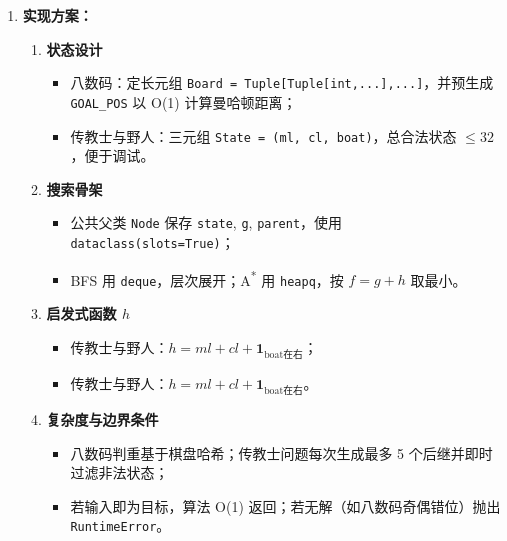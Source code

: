 \documentclass[UTF8]{ctexart}
\begin{document}
\begin{enumerate}
  \item \textbf{实现方案：}
  \begin{enumerate}[label=(\alph*)]
    \item \textbf{状态设计}
      \begin{itemize}
        \item 八数码：定长元组 \verb|Board = Tuple[Tuple[int,...],...]|，并预生成 \verb|GOAL_POS| 以 O(1) 计算曼哈顿距离；
        \item 传教士与野人：三元组 \verb|State = (ml, cl, boat)|，总合法状态 $\le 32$，便于调试。
      \end{itemize}
    \item \textbf{搜索骨架}
      \begin{itemize}
        \item 公共父类 \verb|Node| 保存 \verb|state|, \verb|g|, \verb|parent|，使用 \verb|dataclass(slots=True)|；
        \item BFS 用 \verb|deque|，层次展开；A\textsuperscript{*} 用 \verb|heapq|，按 \(f=g+h\) 取最小。
      \end{itemize}
    \item \textbf{启发式函数 \(h\)}
      \begin{itemize}
        \item 传教士与野人：\(h = ml + cl + \mathbf{1}_{\text{boat在右}}\)；
        \item 传教士与野人：\(h = ml + cl + \mathbf{1}_{\text{boat在右}}\)。
      \end{itemize}
    \item \textbf{复杂度与边界条件}
      \begin{itemize}
        \item 八数码判重基于棋盘哈希；传教士问题每次生成最多 5 个后继并即时过滤非法状态；
        \item 若输入即为目标，算法 O(1) 返回；若无解（如八数码奇偶错位）抛出 \verb|RuntimeError|。
      \end{itemize}
  \end{enumerate}


\end{enumerate}
\end{document}
